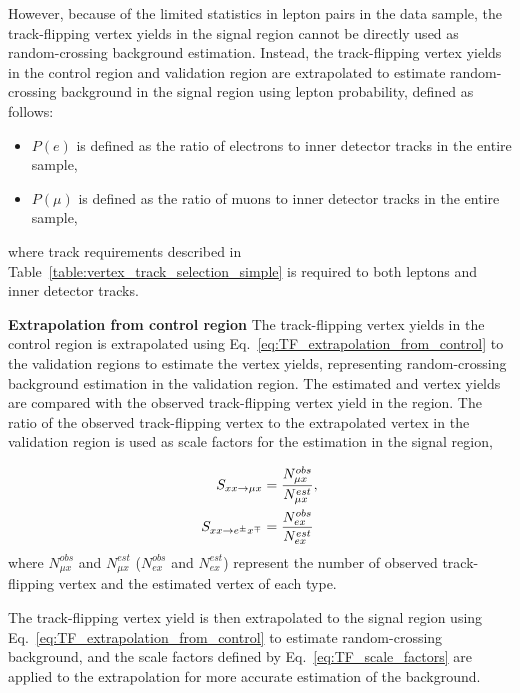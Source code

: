 However, because of the limited statistics in lepton pairs in the data sample, the track-flipping vertex yields in the signal region cannot be directly used as random-crossing background estimation. Instead, the track-flipping vertex yields in the control region and validation region are extrapolated to estimate random-crossing background in the signal region using lepton probability, defined as follows:
\begin{itemize}
\item $P(e)$ is defined as the ratio of electrons to inner detector tracks in the entire sample,
\item $P(\mu)$ is defined as the ratio of muons to inner detector tracks in the entire sample,
\end{itemize}
where track requirements described in Table~\ref{table:vertex_track_selection_simple} is required to both leptons and inner detector tracks.

\textbf{Extrapolation from control region} The track-flipping vertex yields in the control region is extrapolated using Eq.~\ref{eq:TF_extrapolation_from_control} to the validation regions to estimate the vertex yields, representing random-crossing background estimation in the validation region. The estimated \mux and \ex vertex yields are compared with the observed track-flipping vertex yield in the region. The ratio of the observed track-flipping vertex to the extrapolated vertex in the validation region is used as scale factors for the estimation in the signal region,

\begin{align}
    S_{xx\rightarrow \mu x} &= \frac{N_{\mu x}^{obs}}{N_{\mu x}^{est}}, \nonumber \\
    S_{xx\rightarrow e^{\pm}x^{\mp}}   &= \frac{N_{e x}^{obs}}{ N_{e x}^{est}}
\label{eq:random_crossing_scale_factor}
\end{align}
where $N_{\mu x}^{obs}$ and $N_{\mu x}^{est}$ ($N_{ex}^{obs}$ and $N_{ex}^{est}$) represent the number of observed track-flipping vertex and the estimated vertex of each type.

The track-flipping vertex yield is then extrapolated to the signal region using Eq.~\ref{eq:TF_extrapolation_from_control} to estimate random-crossing background, and the scale factors defined by Eq.~\ref{eq:TF_scale_factors} are applied to the extrapolation for more accurate estimation of the background.

